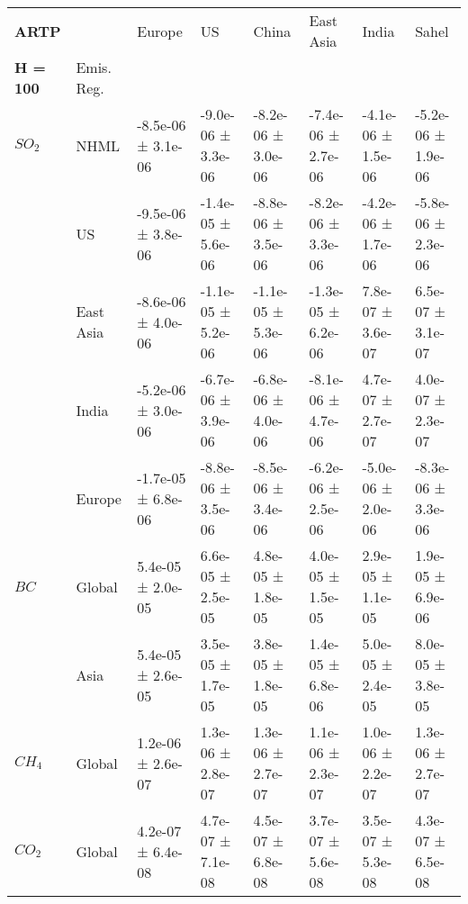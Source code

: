 \documentclass[preview]{standalone}
\newcommand{\nm}{\phantom{-}}
\begin{document}
    \tiny
    \begin{minipage}{\textwidth}
    	\setlength\tabcolsep{5pt}
    \begin{tabular}{llllllll}
\toprule
\textbf{ARTP}        &        &               Europe &                   US &                China &            East Asia &                India &                Sahel \\
\textbf{H = 100}   & Emis. Reg. &                      &                      &                      &                      &                      &                      \\
\midrule
$SO_2$ & NHML &  -8.5e-06 ±  3.1e-06 &  -9.0e-06 ±  3.3e-06 &  -8.2e-06 ±  3.0e-06 &  -7.4e-06 ±  2.7e-06 &  -4.1e-06 ±  1.5e-06 &  -5.2e-06 ±  1.9e-06 \\
       & US &  -9.5e-06 ±  3.8e-06 &  -1.4e-05 ±  5.6e-06 &  -8.8e-06 ±  3.5e-06 &  -8.2e-06 ±  3.3e-06 &  -4.2e-06 ±  1.7e-06 &  -5.8e-06 ±  2.3e-06 \\
       & East Asia &  -8.6e-06 ±  4.0e-06 &  -1.1e-05 ±  5.2e-06 &  -1.1e-05 ±  5.3e-06 &  -1.3e-05 ±  6.2e-06 &   \nm7.8e-07 ±  3.6e-07 &   \nm6.5e-07 ±  3.1e-07 \\
       & India &  -5.2e-06 ±  3.0e-06 &  -6.7e-06 ±  3.9e-06 &  -6.8e-06 ±  4.0e-06 &  -8.1e-06 ±  4.7e-06 &   \nm4.7e-07 ±  2.7e-07 &   \nm4.0e-07 ±  2.3e-07 \\
       & Europe &  -1.7e-05 ±  6.8e-06 &  -8.8e-06 ±  3.5e-06 &  -8.5e-06 ±  3.4e-06 &  -6.2e-06 ±  2.5e-06 &  -5.0e-06 ±  2.0e-06 &  -8.3e-06 ±  3.3e-06 \\
\cmidrule(lr){1-8}
$BC$ & Global &   \nm5.4e-05 ±  2.0e-05 &   \nm6.6e-05 ±  2.5e-05 &   \nm4.8e-05 ±  1.8e-05 &   \nm4.0e-05 ±  1.5e-05 &   \nm2.9e-05 ±  1.1e-05 &   \nm1.9e-05 ±  6.9e-06 \\
       & Asia &   \nm5.4e-05 ±  2.6e-05 &   \nm3.5e-05 ±  1.7e-05 &   \nm3.8e-05 ±  1.8e-05 &   \nm1.4e-05 ±  6.8e-06 &   \nm5.0e-05 ±  2.4e-05 &   \nm8.0e-05 ±  3.8e-05 \\
\cmidrule(lr){1-8}
$CH_4$ & Global &   \nm1.2e-06 ±  2.6e-07 &   \nm1.3e-06 ±  2.8e-07 &   \nm1.3e-06 ±  2.7e-07 &   \nm1.1e-06 ±  2.3e-07 &   \nm1.0e-06 ±  2.2e-07 &   \nm1.3e-06 ±  2.7e-07 \\
\cmidrule(lr){1-8}
$CO_2$ & Global &   \nm4.2e-07 ±  6.4e-08 &   \nm4.7e-07 ±  7.1e-08 &   \nm4.5e-07 ±  6.8e-08 &   \nm3.7e-07 ±  5.6e-08 &   \nm3.5e-07 ±  5.3e-08 &   \nm4.3e-07 ±  6.5e-08 \\
\bottomrule
\end{tabular}

    \end{minipage}
    
\end{document}
